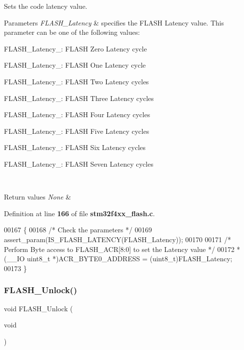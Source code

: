 Sets the code latency value. 


\begin{DoxyParams}{Parameters}
{\em F\+L\+A\+S\+H\+\_\+\+Latency} & specifies the F\+L\+A\+SH Latency value. This parameter can be one of the following values\+: \begin{DoxyItemize}
\item F\+L\+A\+S\+H\+\_\+\+Latency\+\_\+: F\+L\+A\+SH Zero Latency cycle \item F\+L\+A\+S\+H\+\_\+\+Latency\+\_\+: F\+L\+A\+SH One Latency cycle \item F\+L\+A\+S\+H\+\_\+\+Latency\+\_\+: F\+L\+A\+SH Two Latency cycles \item F\+L\+A\+S\+H\+\_\+\+Latency\+\_\+: F\+L\+A\+SH Three Latency cycles \item F\+L\+A\+S\+H\+\_\+\+Latency\+\_\+: F\+L\+A\+SH Four Latency cycles \item F\+L\+A\+S\+H\+\_\+\+Latency\+\_\+: F\+L\+A\+SH Five Latency cycles \item F\+L\+A\+S\+H\+\_\+\+Latency\+\_\+: F\+L\+A\+SH Six Latency cycles \item F\+L\+A\+S\+H\+\_\+\+Latency\+\_\+: F\+L\+A\+SH Seven Latency cycles \end{DoxyItemize}
\\
\hline
\end{DoxyParams}

\begin{DoxyRetVals}{Return values}
{\em None} & \\
\hline
\end{DoxyRetVals}


Definition at line \textbf{ 166} of file \textbf{ stm32f4xx\+\_\+flash.\+c}.


\begin{DoxyCode}
00167 \{
00168   \textcolor{comment}{/* Check the parameters */}
00169   assert_param(IS_FLASH_LATENCY(FLASH\_Latency));
00170   
00171   \textcolor{comment}{/* Perform Byte access to FLASH\_ACR[8:0] to set the Latency value */}
00172   *(\_\_IO uint8\_t *)ACR_BYTE0_ADDRESS = (uint8\_t)FLASH\_Latency;
00173 \}
\end{DoxyCode}
\mbox{\label{group__FLASH_ga4084d0184bab463a1579271bf474aaef}} 
\subsubsection{F\+L\+A\+S\+H\+\_\+\+Unlock()}
{\footnotesize\ttfamily void F\+L\+A\+S\+H\+\_\+\+Unlock (\begin{DoxyParamCaption}\item[{void}]{ }\end{DoxyParamCaption})}



